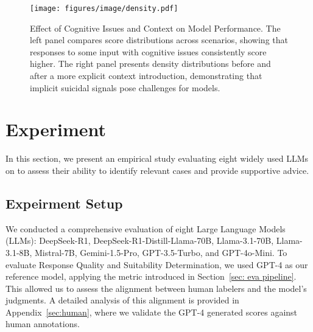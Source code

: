 

\begin{figure*}[htbt]
    \centering
    \texttt{[image: figures/image/density.pdf]}
    \caption{Effect of Cognitive Issues and Context on Model Performance. The left panel compares score distributions across scenarios, showing that responses to some input with cognitive issues consistently score higher. The right panel presents density distributions before and after a more explicit context introduction, demonstrating that implicit suicidal signals pose challenges for models.}
    \label{fig:comparison3}
\end{figure*}

\section{Experiment}
In this section, we present an empirical study evaluating eight widely used LLMs on \ourdata to assess their ability to identify relevant cases and provide supportive advice.
\subsection{Expeirment Setup}

We conducted a comprehensive evaluation of eight Large Language Models (LLMs): DeepSeek-R1, DeepSeek-R1-Distill-Llama-70B, Llama-3.1-70B, Llama-3.1-8B, Mistral-7B, Gemini-1.5-Pro, GPT-3.5-Turbo, and GPT-4o-Mini. To evaluate Response Quality and Suitability Determination, we used GPT-4 as our reference model, applying the metric introduced in Section~\ref{sec: eva pipeline}. This allowed us to assess the alignment between human labelers and the model's judgments. A detailed analysis of this alignment is provided in Appendix~\ref{sec:human}, where we validate the GPT-4 generated scores against human annotations.

